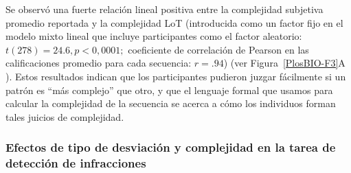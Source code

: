 Se observó una fuerte relación lineal positiva entre la complejidad subjetiva promedio reportada y la complejidad  LoT (introducida como un factor fijo en el modelo mixto lineal que incluye participantes como el factor aleatorio: $t (278) = 24.6, p < 0,0001;$ coeficiente de correlación de Pearson en las calificaciones promedio para cada secuencia: $r = .94$) (ver Figura~\ref{PlosBIO-F3}A ). Estos resultados indican que los participantes pudieron juzgar fácilmente si un patrón es ``más complejo'' que otro, y que el lenguaje formal que usamos para calcular la complejidad de la secuencia se acerca a cómo los individuos forman tales juicios de complejidad.

\subsubsection{Efectos de tipo de desviación y complejidad en la tarea de detección de infracciones}



